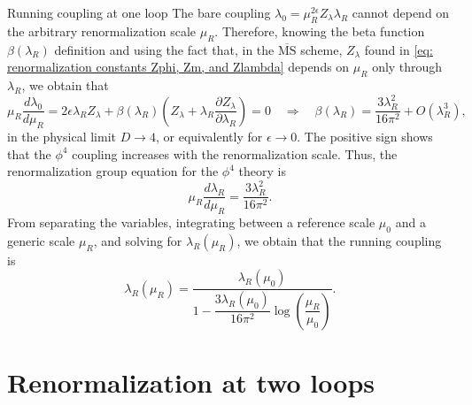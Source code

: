 \documentclass[aspectratio=169,10pt]{beamer}
\newcommand{\MMS}{\overline{\mathrm{MS}}}
\begin{document}
\begin{frame}{Running coupling at one loop}
\setlength{\belowdisplayskip}{2pt}
    The bare coupling $\lambda_0 = \mu_R^{2\epsilon}Z_\lambda\lambda_R$ cannot depend on the arbitrary renormalization scale $\mu_R$. Therefore, knowing the beta function $\beta(\lambda_R)$ definition and using the fact that, in the $\MMS$ scheme, $Z_\lambda$ found in \eqref{eq: renormalization constants Zphi, Zm, and Zlambda} depends on $\mu_R$ only through $\lambda_R$, we obtain that
    \begin{equation}
        \mu_R\frac{d\lambda_0}{d\mu_R} = 2\epsilon\lambda_R Z_\lambda+\beta(\lambda_R)\left(Z_\lambda+\lambda_R\frac{\partial Z_\lambda}{\partial\lambda_R}\right) = 0 \quad \Rightarrow \quad \beta(\lambda_R) = \frac{3\lambda_R^2}{16\pi^2} + O(\lambda_R^3),
    \end{equation}
    in the physical limit $D \to 4$, or equivalently for $\epsilon \to 0$. The positive sign shows that the $\phi^4$ coupling increases with the renormalization scale. Thus, the renormalization group equation for the $\phi^4$ theory is
    \begin{equation}
        \mu_R\frac{d\lambda_R}{d\mu_R} = \frac{3\lambda_R^2}{16\pi^2}.
    \end{equation}
    From separating the variables, integrating between a reference scale $\mu_0$ and a generic scale $\mu_R$, and solving for $\lambda_R(\mu_R)$, we obtain that the running coupling is 
    \begin{equation}
        \lambda_R(\mu_R)=\frac{\lambda_R(\mu_0)}{1-\dfrac{3\lambda_R(\mu_0)}{16\pi^2}\log\left(\dfrac{\mu_R}{\mu_0}\right)}.
    \end{equation}
\end{frame}

\section{Renormalization at two loops}
\end{document}
